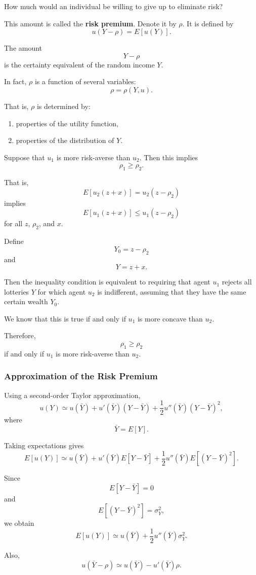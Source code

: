 How much would an individual be willing to give up to eliminate risk?

This amount is called the \textbf{risk premium}. Denote it by \(\rho\). It is defined by
\[
u(Y-\rho)=E[u(Y)].
\]

The amount
\[
Y-\rho
\]
is the certainty equivalent of the random income \(Y\).

In fact, \(\rho\) is a function of several variables:
\[
\rho=\rho(Y,u).
\]

That is, \(\rho\) is determined by:

\begin{enumerate}
    \item properties of the utility function,
    \item properties of the distribution of \(Y\).
\end{enumerate}

Suppose that \(u_1\) is more risk-averse than \(u_2\). Then this implies
\[
\rho_1\ge \rho_2.
\]

That is,
\[
E[u_2(z+x)]=u_2(z-\rho_2)
\]
implies
\[
E[u_1(z+x)]\le u_1(z-\rho_2)
\]
for all \(z\), \(\rho_2\), and \(x\).

Define
\[
Y_0=z-\rho_2
\]
and
\[
Y=z+x.
\]

Then the inequality condition is equivalent to requiring that agent \(u_1\) rejects all lotteries \(Y\) for which agent \(u_2\) is indifferent, assuming that they have the same certain wealth \(Y_0\).

We know that this is true if and only if \(u_1\) is more concave than \(u_2\).

Therefore,
\[
\rho_1\ge \rho_2
\]
if and only if \(u_1\) is more risk-averse than \(u_2\).

\subsubsection{Approximation of the Risk Premium}

Using a second-order Taylor approximation,
\[
u(Y)
\simeq
u(\bar Y)
+
u'(\bar Y)(Y-\bar Y)
+
\frac{1}{2}u''(\bar Y)(Y-\bar Y)^2,
\]
where
\[
\bar Y=E[Y].
\]

Taking expectations gives
\[
E[u(Y)]
\simeq
u(\bar Y)
+
u'(\bar Y)E[Y-\bar Y]
+
\frac{1}{2}u''(\bar Y)E[(Y-\bar Y)^2].
\]

Since
\[
E[Y-\bar Y]=0
\]
and
\[
E[(Y-\bar Y)^2]=\sigma_Y^2,
\]
we obtain
\[
E[u(Y)]
\simeq
u(\bar Y)
+
\frac{1}{2}u''(\bar Y)\sigma_Y^2.
\]

Also,
\[
u(\bar Y-\rho)
\simeq
u(\bar Y)-u'(\bar Y)\rho.
\]

